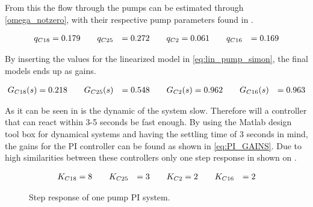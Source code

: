 From this the flow through the pumps can be estimated through \eqref{omega_notzero}, with their respective pump parameters found in .

\begin{equation}
\centering
\begin{split}
q_{C18} &= 0.179 \hspace{20pt} q_{C25} &= 0.272 \hspace{20pt} q_{C2} &= 0.061 \hspace{20pt} q_{C16} &= 0.169
\end{split}
\end{equation}

By inserting the values for the linearized model in \eqref{eq:lin_pump_simon}, the final models ends up as gains. 

\begin{equation}
\centering
	\begin{split}
	G_{C18}(s) &= 0.218 \hspace{20pt} G_{C25}(s) &= 0.548 \hspace{20pt} G_{C2}(s) &= 0.962 \hspace{20pt} G_{C16}(s) &= 0.963
	\end{split}
\end{equation}

As it can be seen in  is the dynamic of the system slow. Therefore will a controller that can react within 3-5 seconds be fast enough.
By using the Matlab design tool box for dynamical systems and having the settling time of 3 seconds in mind, the gains for the PI controller can be found as shown in \eqref{eq:PI_GAINS}. 
Due to high similarities between these controllers only one step response in shown on .

\begin{equation}
\centering
	\begin{split}
	K_{C18} &= 8 \hspace{20pt} K_{C25} &= 3 \hspace{20pt} K_{C2} &= 2 \hspace{20pt} K_{C16} &= 2
	\end{split}
	\label{eq:PI_GAINS}
\end{equation}

\begin{figure}[H]
\centering

\caption{Step response of one pump PI system.}
\label{fig:Tikz_PI_PUMP_GAIN}
\end{figure}

